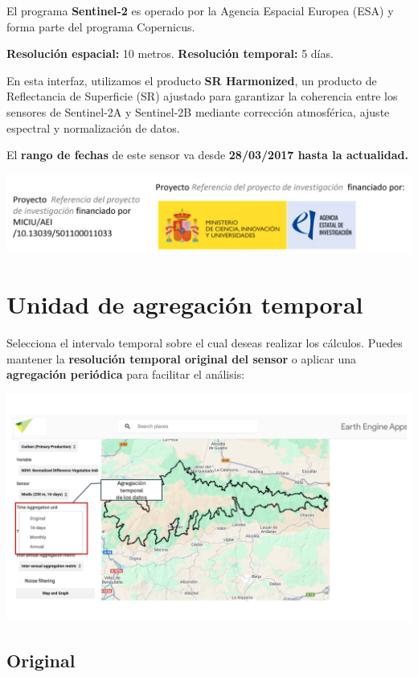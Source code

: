 \documentclass[
]{book}
\begin{document}
El programa \textbf{Sentinel-2} es operado por la Agencia Espacial Europea (ESA) y forma parte del programa Copernicus.

\textbf{Resolución espacial:} 10 metros.
\textbf{Resolución temporal:} 5 días.

En esta interfaz, utilizamos el producto \textbf{SR Harmonized}, un producto de Reflectancia de Superficie (SR) ajustado para garantizar la coherencia entre los sensores de Sentinel-2A y Sentinel-2B mediante corrección atmosférica, ajuste espectral y normalización de datos.

El \textbf{rango de fechas} de este sensor va desde \textbf{28/03/2017 hasta la actualidad.}

\includegraphics{assets/logo.jpeg}

\chapter{Unidad de agregación temporal}\label{ud-agregacion-temporal}

Selecciona el intervalo temporal sobre el cual deseas realizar los cálculos. Puedes mantener la \textbf{resolución temporal original del sensor} o aplicar una \textbf{agregación periódica} para facilitar el análisis:

\includegraphics{assets/aggregation_es.png}

\section{\texorpdfstring{\textbf{Original}}{Original}}\label{original}
\end{document}
